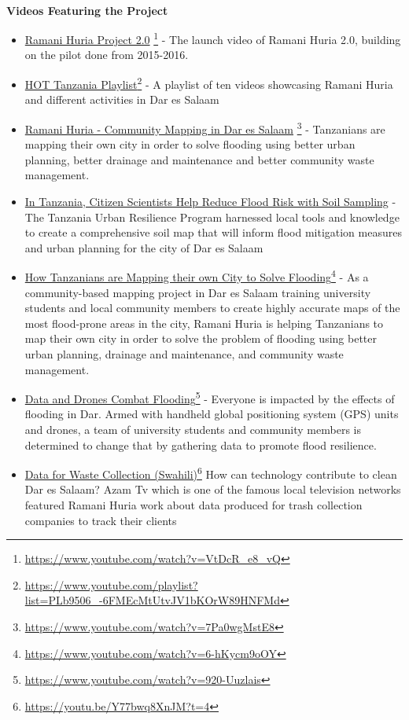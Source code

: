 \documentclass[a4paper,12pt,twoside]{article}
\begin{document}
\

\textbf{Videos Featuring the Project}
	\begin{itemize}
		\item \href{https://www.youtube.com/watch?v=VtDcR_e8_vQ}{Ramani Huria Project 2.0} \footnote{\url{https://www.youtube.com/watch?v=VtDcR_e8_vQ}}
		- The launch video of Ramani Huria 2.0, building on the pilot done from 2015-2016.
		\item \href{https://www.youtube.com/playlist?list=PLb9506_-6FMEcMtUtvJV1bKOrW89HNFMd}{HOT Tanzania Playlist}\footnote{\url{https://www.youtube.com/playlist?list=PLb9506_-6FMEcMtUtvJV1bKOrW89HNFMd}}
		- A playlist of ten videos showcasing Ramani Huria and different activities in Dar es Salaam
		\item \href{https://www.youtube.com/watch?v=7Pa0wgMstE8}{Ramani Huria - Community Mapping in Dar es Salaam} \footnote{\url{https://www.youtube.com/watch?v=7Pa0wgMstE8}} - Tanzanians are mapping their own city in order to solve flooding using better urban planning, better drainage and maintenance and better community waste management.
		\item \href{https://www.worldbank.org/en/news/video/2019/05/15/in-tanzania-citizen-scientists-help-reduce-flood-risk-with-soil-sampling}{In Tanzania, Citizen Scientists Help Reduce Flood Risk with Soil Sampling}
		- The Tanzania Urban Resilience Program harnessed local tools and knowledge to create a comprehensive soil map that will inform flood mitigation measures and urban planning for the city of Dar es Salaam
		\item \href{https://www.youtube.com/watch?v=6-hKycm9oOY}{How Tanzanians are Mapping their own City to Solve Flooding}\footnote{\url{https://www.youtube.com/watch?v=6-hKycm9oOY}}
		- As a community-based mapping project in Dar es Salaam training university students and local community members to create highly accurate maps of the most flood-prone areas in the city, Ramani Huria is helping Tanzanians to map their own city in order to solve the problem of flooding using better urban planning, drainage and maintenance, and community waste management.
		\item \href{https://www.youtube.com/watch?v=920-Uuzlais}{Data and Drones Combat Flooding}\footnote{\url{https://www.youtube.com/watch?v=920-Uuzlais}}
		- Everyone is impacted by the effects of flooding in Dar. Armed with handheld global positioning system (GPS) units and drones, a team of university students and community members is determined to change that by gathering data to promote flood resilience.
		\item \href{https://youtu.be/Y77bwq8XnJM?t=4}{ Data for Waste Collection (Swahili)}\footnote{\url{https://youtu.be/Y77bwq8XnJM?t=4}}
		How can technology contribute to clean Dar es Salaam? Azam Tv which is one of the famous local television networks featured Ramani Huria work about data produced for trash collection companies to track their clients
	\end{itemize}
\end{document}
